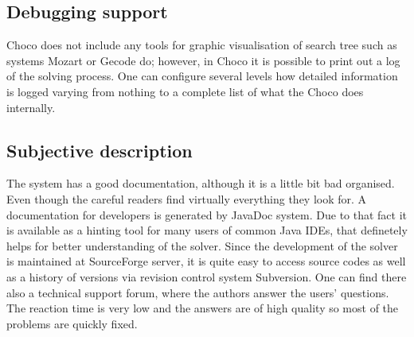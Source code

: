 \subsection{Debugging support}
Choco does not include any tools for graphic visualisation of search tree such as systems Mozart or Gecode do;
however, in Choco it is possible to print out a log of the solving process.
One can configure several levels how detailed information is logged varying from
nothing to a complete list of what the Choco does internally.

\subsection{Subjective description}
The system has a good documentation, although it is a little bit bad organised. Even though the careful readers
find virtually everything they look for. A documentation for developers is generated
by JavaDoc system. Due to that fact it is available as a hinting tool for many users of common Java IDEs, 
that definetely helps for better understanding of the solver. Since the development of the solver is
maintained at SourceForge server, it is quite easy to access source codes as well as a history of versions via
revision control system Subversion. One can find there also a technical support forum, where the authors
answer the users' questions. The reaction time is very low and the answers are of high
quality so most of the problems are quickly fixed.